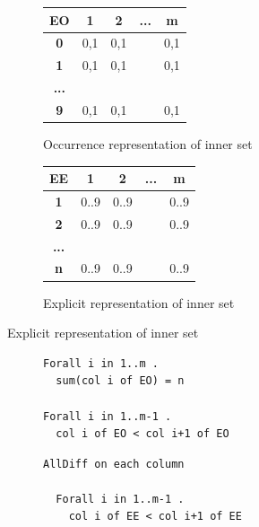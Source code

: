 \documentclass[CS4402-Notes.tex]{subfiles}
\begin{document}
\begin{figure}[H]
\centering
\begin{subfigure}{0.45\textwidth}
\centering
\begin{tabular}{| c | c | c | c | c |}
  \hline
  \textbf{EO} & \textbf{1} & \textbf{2} & \textbf{...} & \textbf{m} \\
  \hline
  \textbf{0} & 0,1 & 0,1 &  & 0,1 \\
  \hline
  \textbf{1} & 0,1 & 0,1 &  & 0,1 \\
  \hline
  \textbf{...} & & & & \\
  \hline
  \textbf{9} & 0,1 & 0,1 &  & 0,1 \\
  \hline
\end{tabular}
\caption{Occurrence representation of inner set}
\end{subfigure}
%
\begin{subfigure}{0.45\textwidth}
\centering
\begin{tabular}{| c | c | c | c | c |}
  \hline
  \textbf{EE} & \textbf{1} & \textbf{2} & \textbf{...} & \textbf{m} \\
  \hline
  \textbf{1} & 0..9 & 0..9 &  & 0..9 \\
  \hline
  \textbf{2} & 0..9 & 0..9 &  & 0..9 \\
  \hline
  \textbf{...} & & & & \\
  \hline
  \textbf{n} & 0..9 & 0..9 &  & 0..9 \\
  \hline
\end{tabular}
\caption{Explicit representation of inner set}
\end{subfigure}
\end{figure}

\begin{figure}[H]
\centering
\begin{subfigure}{0.45\textwidth}
\begin{lstlisting}[caption={Constraints for occurrence representation of inner set}]
Forall i in 1..m . 
  sum(col i of EO) = n

Forall i in 1..m-1 .
  col i of EO < col i+1 of EO
\end{lstlisting}
\end{subfigure}
\hspace*{\fill}
\begin{subfigure}{0.45\textwidth}
\begin{lstlisting}[caption={Constraints for occurrence representation of inner set}]
  AllDiff on each column
    
  Forall i in 1..m-1 .
    col i of EE < col i+1 of EE
\end{lstlisting}
\end{subfigure}
\end{figure}
\end{document}
